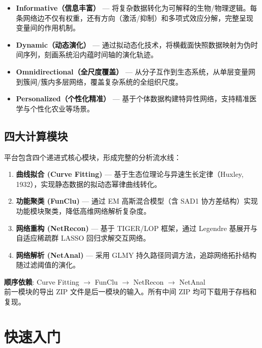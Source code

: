 \documentclass[12pt,a4paper]{ctexart}
\begin{document}
\begin{itemize}[leftmargin=*]
    \item \textbf{Informative（信息丰富）} --- 将复杂数据转化为可解释的生物/物理逻辑。每条网络边不仅有权重，还有方向（激活/抑制）和多项式效应分解，完整呈现变量间的作用机制。
    \item \textbf{Dynamic（动态演化）} --- 通过拟动态化技术，将横截面快照数据映射为伪时间序列，刻画系统沿内蕴时间轴的演化轨迹。
    \item \textbf{Omnidirectional（全尺度覆盖）} --- 从分子互作到生态系统，从单层变量网到簇间/簇内多层网络，覆盖复杂系统的全组织尺度。
    \item \textbf{Personalized（个性化精准）} --- 基于个体数据构建特异性网络，支持精准医学与个性化农业等场景。
\end{itemize}

\subsection{四大计算模块}

平台包含四个递进式核心模块，形成完整的分析流水线：

\begin{enumerate}[leftmargin=*]
    \item \textbf{曲线拟合 (Curve Fitting)} --- 基于生态位理论与异速生长定律（Huxley, 1932），实现静态数据的拟动态幂律曲线转化。
    \item \textbf{功能聚类 (FunClu)} --- 通过 EM 高斯混合模型（含 SAD1 协方差结构）实现功能模块聚类，降低高维网络解析复杂度。
    \item \textbf{网络重构 (NetRecon)} --- 基于 TIGER/LOP 框架，通过 Legendre 基展开与自适应稀疏群 LASSO 回归求解交互网络。
    \item \textbf{网络解析 (NetAnal)} --- 采用 GLMY 持久路径同调方法，追踪网络拓扑结构随过滤阈值的演化。
\end{enumerate}

\begin{infobox}[数据流说明]
    \textbf{顺序依赖}: Curve Fitting $\rightarrow$ FunClu $\rightarrow$ NetRecon $\rightarrow$ NetAnal\\
    前一模块的导出 ZIP 文件是后一模块的输入。所有中间 ZIP 均可下载用于存档和复现。
\end{infobox}

\section{快速入门}
\end{document}
